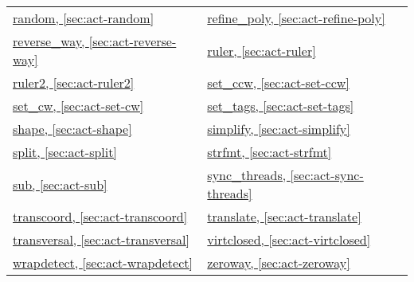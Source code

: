 \begin{tabular}{p{}p{}}
\hyperref[sec:act-random]{random, \ref*{sec:act-random}} & \hyperref[sec:act-refine-poly]{refine\_poly, \ref*{sec:act-refine-poly}} \\
\hyperref[sec:act-reverse-way]{reverse\_way, \ref*{sec:act-reverse-way}} & \hyperref[sec:act-ruler]{ruler, \ref*{sec:act-ruler}} \\
\hyperref[sec:act-ruler2]{ruler2, \ref*{sec:act-ruler2}} & \hyperref[sec:act-set-ccw]{set\_ccw, \ref*{sec:act-set-ccw}} \\
\hyperref[sec:act-set-cw]{set\_cw, \ref*{sec:act-set-cw}} & \hyperref[sec:act-set-tags]{set\_tags, \ref*{sec:act-set-tags}} \\
\hyperref[sec:act-shape]{shape, \ref*{sec:act-shape}} & \hyperref[sec:act-simplify]{simplify, \ref*{sec:act-simplify}} \\
\hyperref[sec:act-split]{split, \ref*{sec:act-split}} & \hyperref[sec:act-strfmt]{strfmt, \ref*{sec:act-strfmt}} \\
\hyperref[sec:act-sub]{sub, \ref*{sec:act-sub}} & \hyperref[sec:act-sync-threads]{sync\_threads, \ref*{sec:act-sync-threads}} \\
\hyperref[sec:act-transcoord]{transcoord, \ref*{sec:act-transcoord}} & \hyperref[sec:act-translate]{translate, \ref*{sec:act-translate}} \\
\hyperref[sec:act-transversal]{transversal, \ref*{sec:act-transversal}} & \hyperref[sec:act-virtclosed]{virtclosed, \ref*{sec:act-virtclosed}} \\
\hyperref[sec:act-wrapdetect]{wrapdetect, \ref*{sec:act-wrapdetect}} & \hyperref[sec:act-zeroway]{zeroway, \ref*{sec:act-zeroway}} \\
\end{tabular}
